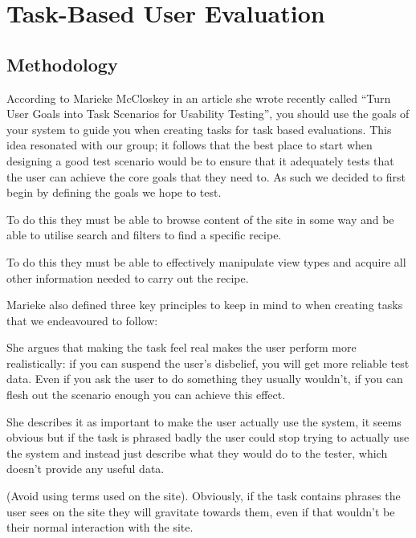 \section{Task-Based User Evaluation}

\subsection{Methodology}

According to Marieke McCloskey in an article she wrote recently called
``Turn User Goals into Task Scenarios for Usability
Testing'', you should use the goals of your system to
guide you when creating tasks for task based evaluations. This idea
resonated with our group; it follows that the best place to start when
designing a good test scenario would be to ensure that it adequately
tests that the user can achieve the core goals that they need to. As
such we decided to first begin by defining the goals we hope to test.

 To do this they must be able
to browse content of the site in some way and be able to utilise
search and filters to find a specific recipe.

 To do this they must be able to
effectively manipulate view types and acquire all other information
needed to carry out the recipe.

\vspace{5mm}
Marieke also defined three key principles to keep in mind to when
creating tasks that we endeavoured to follow:

 She argues that making
the task feel real makes the user perform more realistically: if you
can suspend the user's disbelief, you will get more reliable test
data. Even if you ask the user to do something they usually wouldn't,
if you can flesh out the scenario enough you can achieve this effect.

 She describes it as important to make
the user actually use the system, it seems obvious but if the task is
phrased badly the user could stop trying to actually use the system
and instead just describe what they would do to the tester, which
doesn’t provide any useful data.

 (Avoid using terms used on the site).
Obviously, if the task contains phrases the user sees on the site they
will gravitate towards them, even if that wouldn't be their normal
interaction with the site.


